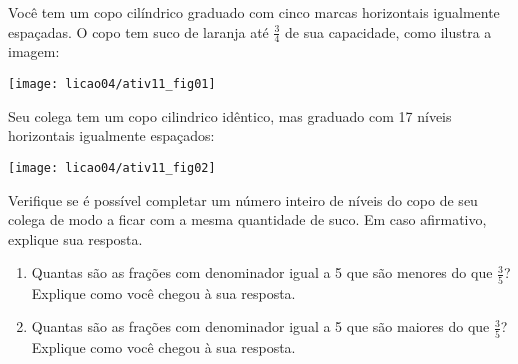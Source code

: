 \begin{atividade}{}\label{chap4-ativ11}

Você tem um copo cilíndrico graduado com cinco marcas horizontais igualmente espaçadas. O copo tem suco de laranja até $\frac{3}{4}$ de sua capacidade, co\-mo ilustra a imagem:



\centering
\texttt{[image: licao04/ativ11\_fig01]}
\justify

Seu colega tem um copo cilindrico idêntico, mas graduado com 17 níveis horizontais igualmente espaçados:

\centering
\texttt{[image: licao04/ativ11\_fig02]}
\justify

Verifique se é possível completar um número inteiro de níveis do copo de seu colega de modo a ficar com a mesma quantidade de suco. Em caso afirmativo, explique sua resposta.
\end{atividade}

\begin{atividade}{}\label{chap4-ativ12}

\begin{enumerate}  %
  \item     Quantas são as frações com denominador igual a 5 que são menores do que $\frac{3}{5}$? Explique como você chegou à sua resposta.
  \item     Quantas são as frações com denominador igual a 5 que são maiores do que $\frac{3}{5}$? Explique como você chegou à sua resposta.
\end{enumerate} %
\end{atividade}



